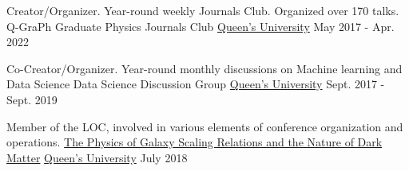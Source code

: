 \begin{cventries}
  \cventry
    {Creator/Organizer. Year-round weekly Journals Club. Organized over 170 talks.} %
    {Q-GraPh Graduate Physics Journals Club} %
    {\href{https://www.queensu.ca/}{Queen's University}} %
    {May 2017 - Apr. 2022} %
    
  \cventry
    {Co-Creator/Organizer. Year-round monthly discussions on Machine learning and Data Science} %
    {Data Science Discussion Group} %
    {\href{https://www.queensu.ca/}{Queen's University}} %
    {Sept. 2017 - Sept. 2019} %
 
  \cventry
    {Member of the LOC, involved in various elements of conference organization and operations.} %
    {\href{https://darkmatter2018.weebly.com/}{The Physics of Galaxy Scaling Relations and the Nature of Dark Matter}} %
    {\href{https://www.queensu.ca/}{Queen's University}} %
    {July 2018} %
 
\end{cventries}
